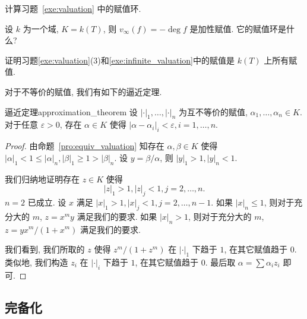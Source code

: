 \begin{exercise}
计算习题~\ref{exe:valuation} 中的赋值环.
\end{exercise}

\begin{exercise}\label{exe:infinite_valuation}
设 $k$ 为一个域, $K=k(T)$, 则 $v_\infty(f)=-\deg f$ 是加性赋值. 它的赋值环是什么?
\end{exercise}

\begin{exercise}
证明习题\ref{exe:valuation}(3)和\ref{exe:infinite_valuation}中的赋值是 $k(T)$ 上所有赋值.
\end{exercise}

对于不等价的赋值, 我们有如下的逼近定理.

\begin{proposition}{逼近定理}{approximation_theorem}
设 $|\cdot|_1,\dots,|\cdot|_n$ 为互不等价的赋值, $\alpha_1,\dots,\alpha_n\in K$. 对于任意 $\varepsilon>0$, 存在 $\alpha\in K$ 使得 $|\alpha-\alpha_i|_i<\varepsilon,i=1,\dots,n$.
\end{proposition}
\begin{proof}
由命题~\ref{pro:equiv_valuation} 知存在 $\alpha,\beta\in K$ 使得 $|\alpha|_1<1\le|\alpha|_n,|\beta|_1\ge1>|\beta|_n$. 设 $y=\beta/\alpha$, 则 $|y|_1>1,|y|_n<1$.

我们归纳地证明存在 $z\in K$ 使得 
  \[|z|_1>1,|z|_j<1,j=2,\dots,n.\]
$n=2$ 已成立. 设 $x$ 满足 $|x|_1>1,|x|_j<1,j=2,\dots,n-1$. 如果 $|x|_n\le 1$, 则对于充分大的 $m$, $z=x^m y$ 满足我们的要求. 如果 $|x|_n>1$, 则对于充分大的 $m$, $z=yx^m/(1+x^m)$ 满足我们的要求.

我们看到, 我们所取的 $z$ 使得 $z^m/(1+z^m)$ 在 $|\cdot|_1$ 下趋于 $1$, 在其它赋值趋于 $0$. 类似地, 我们构造 $z_i$ 在 $|\cdot|_i$ 下趋于 $1$, 在其它赋值趋于 $0$. 最后取 $\alpha=\sum \alpha_i z_i$ 即可.
\end{proof}


\subsection{完备化}

